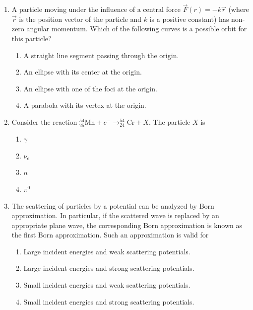 \documentclass[journal,12pt,onecolumn]{IEEEtran}
\theoremstyle{remark}
\begin{document}
\begin{enumerate}
\item A particle moving under the influence of a central force $\vec{F}(r) = -k\vec{r}$ (where $\vec{r}$ is the position vector of the particle and $k$ is a positive constant) has non-zero angular momentum. Which of the following curves is a possible orbit for this particle?

\begin{enumerate}
    \item A straight line segment passing through the origin.
    \item An ellipse with its center at the origin.
    \item An ellipse with one of the foci at the origin.
    \item A parabola with its vertex at the origin.

\end{enumerate}
    


\item Consider the reaction $
^{54}_{25}\mathrm{Mn} + e^- \longrightarrow ^{54}_{24}\mathrm{Cr} + X
$. The particle $X$ is

\begin{multicols}{4}
\begin{enumerate}
    \item $\gamma$
    \item $\nu_e$
    \item $n$
    \item $\pi^0$
\end{enumerate}
\end{multicols}

\item The scattering of particles by a potential can be analyzed by Born approximation. In particular, if the scattered wave is replaced by an appropriate plane wave, the corresponding Born approximation is known as the first Born approximation. Such an approximation is valid for


\begin{enumerate}
    \item Large incident energies and weak scattering potentials.
    \item Large incident energies and strong scattering potentials.
    \item Small incident energies and weak scattering potentials.
    \item Small incident energies and strong scattering potentials.
\end{enumerate}



\end{enumerate}
\end{document}
